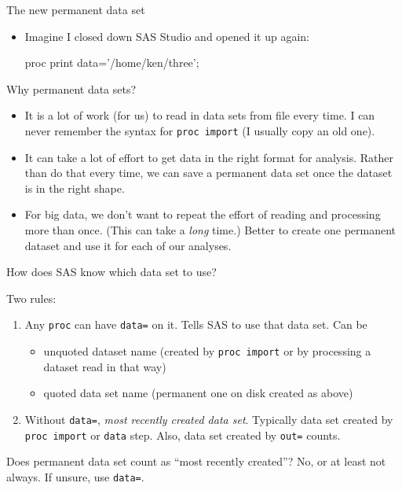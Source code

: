 \documentclass[unknownkeysallowed]{beamer}\usepackage[]{graphicx}\usepackage[]{color}
\begin{document}
\begin{frame}[fragile]{The new permanent data set}
  
  \begin{itemize}
  \item Imagine I closed down SAS Studio and opened it up again:
    
    \begin{Sascode}[store=me]
proc print data='/home/ken/three';
    \end{Sascode}
    
  \end{itemize}
  
\end{frame}


\begin{frame}[fragile]{Why permanent data sets?}
  
  \begin{itemize}
  \item It is a lot of work (for us) to read in data sets from file
    every time. I can never remember the syntax for \texttt{proc
      import} (I usually copy an old one).
  \item It can take a lot of effort to get data in the right format
    for analysis. Rather than do that every time, we can save a
    permanent data set once the dataset is in the right shape.
  \item For big data, we don't want to repeat the effort of reading
    and processing more than once. (This can take a \emph{long} time.)
    Better to create one permanent dataset and use it for each of our
    analyses. 
  \end{itemize}
  
\end{frame}

\begin{frame}[fragile]{How does SAS know which data set to use?}

Two rules:

\begin{enumerate}
\item Any \texttt{proc} can have \texttt{data=} on it. Tells SAS to
  use that data set. Can be
  \begin{itemize}
  \item unquoted dataset name (created by \texttt{proc import} or by
    processing a dataset read in that way)
  \item quoted data set name (permanent one on disk created as above)
  \end{itemize}
\item Without \texttt{data=}, \emph{most recently created data
    set}. Typically data set created by \texttt{proc import} or
  \texttt{data} step.  Also, data set created by \texttt{out=} counts.
\end{enumerate}
Does permanent data set count as ``most recently created''? No,
  or at least not always. If unsure, use \texttt{data=}.  
\end{frame}
\end{document}
